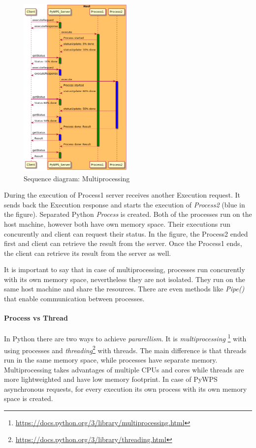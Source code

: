 \documentclass{gifce}
\begin{document}
\begin{figure}[h!]
\centering
\includegraphics[width=0.5\textwidth]{img/Diag_multiprocessing.png}
\caption{Sequence diagram: Multiprocessing}
\label{fig:Diag_multiprocessing}
\end{figure}

During the execution of Process1 server receives another Execution request. It sends back the Execution response and starts the execution
of \textit{Process2} (blue in the figure). Separated Python \textit{Process} is created. Both of the processes run on the host machine, however both have own memory
space. Their executions run concurently and client can request their status. In the figure, the Process2 ended first and client can retrieve
the result from the server. Once the Process1 ends, the client can retrieve its result from the server as well.

It is important to say that in case of multiprocessing, processes run concurently with its own memory space, nevertheless they are not isolated.
They run on the same host machine and share the resources. There are even methods like \textit{Pipe()} that enable communication between 
processes.

\paragraph{Process vs Thread} In Python there are two ways to achieve \textit{pararellism}. It is \textit{multiprocessing}
\footnote{\url{https://docs.python.org/3/library/multiprocessing.html}} with using processes and \textit{threading}\footnote{\url{https://docs.python.org/3/library/threading.html}} with threads. The main difference is that threads run in the same memory space, while processes
have separate memory. Multiprocessing takes advantages of multiple CPUs and cores while threads are more lightweighted and have low memory
footprint. In case of PyWPS asynchronous requests, for every execution its own process with its own memory space is created.
\end{document}
